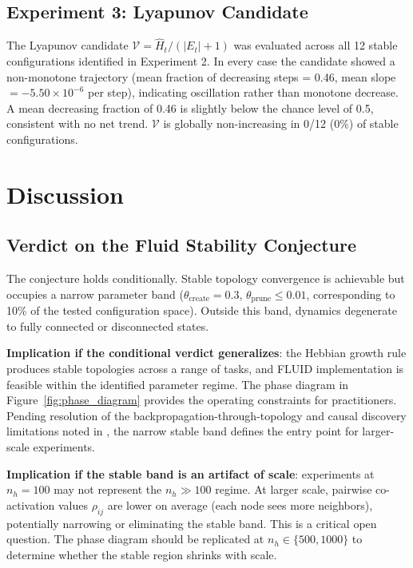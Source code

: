 \documentclass[12pt]{article}
\begin{document}
\subsection{Experiment 3: Lyapunov Candidate}

The Lyapunov candidate $\mathcal{V} = \hat{H}_t / (|E_t|+1)$ was evaluated across all 12 stable configurations identified in Experiment 2. In every case the candidate showed a non-monotone trajectory (mean fraction of decreasing steps = 0.46, mean slope $= -5.50 \times 10^{-6}$ per step), indicating oscillation rather than monotone decrease. A mean decreasing fraction of 0.46 is slightly below the chance level of 0.5, consistent with no net trend. $\mathcal{V}$ is globally non-increasing in 0/12 (0\%) of stable configurations.

\section{Discussion}

\subsection{Verdict on the Fluid Stability Conjecture}

The conjecture holds conditionally. Stable topology convergence is achievable but occupies a narrow parameter band ($\theta_{\text{create}} = 0.3$, $\theta_{\text{prune}} \leq 0.01$, corresponding to 10\% of the tested configuration space). Outside this band, dynamics degenerate to fully connected or disconnected states.

\textbf{Implication if the conditional verdict generalizes}: the Hebbian growth rule produces stable topologies across a range of tasks, and FLUID implementation is feasible within the identified parameter regime. The phase diagram in Figure~\ref{fig:phase_diagram} provides the operating constraints for practitioners. Pending resolution of the backpropagation-through-topology and causal discovery limitations noted in \cite{lin2026fluid}, the narrow stable band defines the entry point for larger-scale experiments.

\textbf{Implication if the stable band is an artifact of scale}: experiments at $n_h = 100$ may not represent the $n_h \gg 100$ regime. At larger scale, pairwise co-activation values $\rho_{ij}$ are lower on average (each node sees more neighbors), potentially narrowing or eliminating the stable band. This is a critical open question. The phase diagram should be replicated at $n_h \in \{500, 1000\}$ to determine whether the stable region shrinks with scale.
\end{document}
